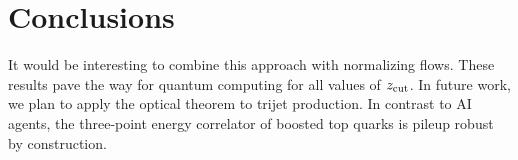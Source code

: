 \section{Conclusions}\label{sec:conclusions}

It would be interesting to combine this approach with normalizing flows.
These results pave the way for quantum computing for all values of
$z_{\rm cut}$. In future work, we plan to apply the optical theorem to
trijet production. In contrast to AI agents, the three-point energy
correlator of boosted top quarks is pileup robust by construction.

